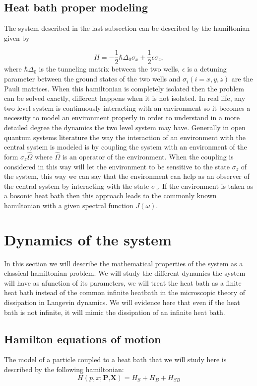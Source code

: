 \subsection{Heat bath proper modeling}

The system described in the last subsection can be described by the hamiltonian given by

\begin{equation}
H=-\frac{1}{2}\hbar\Delta_0\sigma_x	+\frac{1}{2}\epsilon\sigma_z,
\end{equation}
where $\hbar\Delta_0$ is the tunneling matrix between the two wells, $\epsilon$ is a detuning parameter between the ground states of the two wells and $\sigma_i(i=x,y,z)$ are the Pauli matrices. When this hamiltonian is completely isolated then the problem can be solved exactly, different happens when it is not isolated. In real life, any two level system is continuously interacting with an environment so it becomes a necessity to model an environment properly in order to understand in a more detailed degree the dynamics the two level system may have. Generally in open quantum systems literature \cite{leggett1987dynamics} the way the interaction of an environment with the central system is modeled is by coupling the system with an environment  of the form $\sigma_z\hat{\Omega}$ where $\hat{\Omega}$ is an operator of the environment. When the coupling is considered in this way will let the environment to be sensitive to the state $\sigma_z$ of the system, this way we can say that the environment can help as an observer of the central system by interacting with the state $\sigma_z$. If the environment is taken as a bosonic heat bath then this approach leads to the commonly known  hamiltonian with a given spectral function $J(\omega)$.


\section{Dynamics of the system}
In this section we will describe the mathematical properties of the system as a classical hamiltonian problem. We will study the different dynamics the system will have as afunction of its parameters, we will treat the heat bath as a finite heat bath instead of the common infinite heatbath in the microscopic theory of dissipation in Langevin dynamics. We will evidence here that even if the heat bath is not infinite, it will mimic the dissipation of an infinite heat bath.

\subsection{Hamilton equations of motion}
The model of a particle coupled to a heat bath that we will study here is described by the following hamiltonian:
\begin{equation}
H(p,x;\textbf{P,X})=H_{S}+H_B+H_{SB}
\label{eq:total_hamiltonian}
\end{equation}

